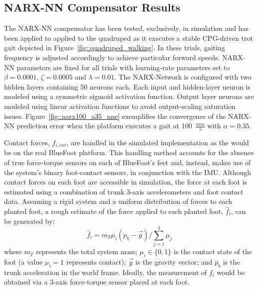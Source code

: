 		\subsection{NARX-NN Compensator Results}
			The NARX-NN compensator has been tested, exclusively, in simulation and has been applied to applied to the quadruped as it executes a stable CPG-driven trot gait depicted in Figure~\ref{fig::quadruped_walking}. In these trials, gaiting frequency is adjusted accordingly to achieve particular forward speeds. NARX-NN parameters are fixed for all trials with learning-rate  parameters set to $\beta=0.0001$, $\zeta=0.0005$ and $\lambda = 0.01$. The NARX-Network is configured with two hidden layers containing 50 neurons each. Each input and hidden-layer neuron is modeled using a symmetric sigmoid activation function. Output layer neurons are modeled using linear activation functions to  avoid output-scaling saturation issues. Figure~\ref{fig::narx100_a35_nne} exemplifies the convergence of the NARX-NN prediction error when the platform executes a gait at  100~$\frac{mm}{s}$ with $\alpha = 0.35$.

			Contact forces, ${f}_{i,ext}$, are handled in the simulated implementation as the would be on the real BlueFoot platform. This handling method accounts for the absence of true force-torque sensors on each of BlueFoot's feet and, instead, makes use of the system's binary foot-contact sensors, in conjunction with the IMU. Although contact forces on each foot are accessible in simulation, the force at each foot is estimated using a combination of trunk 3-axis accelerometers and foot contact data. Assuming a rigid system and a uniform distribution of forces to each planted foot, a rough estimate of the force applied to each \Ith planted foot, $\hat{f}_{i}$, can be generated by:
				\begin{equation}
					\hat{f}_{i} = {m_{T}\mu_{i}} \left(\ddot{p}_{b} - \vec{g}\right)/{\sum_{j=1}^{4}{\mu_{j}}}
				\end{equation}
			where $m_{T}$ represents the total system mass; $\mu_{i}\in \{0,1\}$ is the contact state of the \Ith
			foot (a value $\mu_{i}=1$ represents contact); $\vec{g}$ is the gravity vector; and $\ddot{p}_{b}$ is the trunk acceleration in the world frame. Ideally, the measurement of ${f}_{i}$ would be obtained via a 3-axis force-torque sensor placed at each foot.

